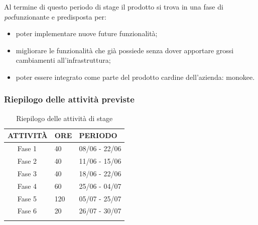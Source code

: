 Al termine di questo periodo di stage il prodotto si trova in una fase di \emph{\gls{poc}}\glsfirstoccur funzionante e predisposta per:
\begin{itemize}
	\item poter implementare nuove future funzionalità;
	\item migliorare le funzionalità che già possiede senza dover apportare grossi cambiamenti all'infrastruttura;
	\item poter essere integrato come parte del prodotto cardine dell'azienda: \gls{monokee}.
\end{itemize}

\subsubsection{Riepilogo delle attività previste}
\begin{longtable}{|r l|p{1cm}|p{3cm}|}
	\hline
	\multicolumn{2}{|c|}{\textbf{ATTIVITÀ}} & \textbf{ORE} & \textbf{PERIODO}\tabularnewline
	\hline
	& Fase 1 & 40 & 08/06 - 22/06 \\\hline	
	& Fase 2 & 40 & 11/06 - 15/06\\\hline
	& Fase 3 & 40 & 18/06 - 22/06\\\hline
	& Fase 4 & 60 & 25/06 - 04/07 \\\hline
	& Fase 5 & 120 & 05/07 - 25/07 \\\hline
	& Fase 6 & 20 & 26/07 - 30/07 \\\hline	
	\caption{Riepilogo delle attività di stage}
\end{longtable}

